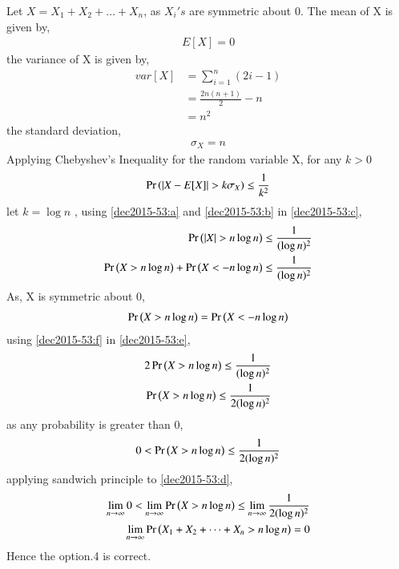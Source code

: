 Let $X= X_1 +X_2 + \dots + X_n $,
as $X_i 's$ are symmetric about 0.
The mean of X is given by,
\begin{align}
E[X]=0 \label{dec2015-53:a}
\end{align}
the variance of X is given by,
\begin{align}
var[X]&= \sum_{i=1}^{n}(2i -1)\\
   &= \frac{2n(n+1)}{2} - n\\
   &= n^{2}
\end{align}
the standard deviation,
\begin{align}
\sigma_X = n \label{dec2015-53:b}
\end{align}
Applying Chebyshev's Inequality for the random variable X, for any $k>0$
\begin{align}
\Pr\left(\left\vert X-E[X]\right\vert> k\sigma_X\right) \leq \frac{1}{k^{2}} \label{dec2015-53:c}
\end{align}
let $k=\log{n} $ ,
using \eqref{dec2015-53:a} and \eqref{dec2015-53:b} in \eqref{dec2015-53:c},
\begin{align}
\Pr\left(\left\vert X\right\vert> n\log{n}\right) \leq \frac{1}{(\log{n})^{2}}\\
\Pr\left(X> n\log{n}\right) + \Pr\left(X< -n\log{n}\right) \leq \frac{1}{(\log{n})^{2}} \label{dec2015-53:e}
\end{align}
As, X is symmetric about 0,
\begin{align}
\Pr\left(X> n\log{n}\right) =\Pr\left(X< -n\log{n}\right) \label{dec2015-53:f}
\end{align}
using \eqref{dec2015-53:f} in \eqref{dec2015-53:e},
\begin{align}
2\Pr\left(X> n\log{n}\right) \leq \frac{1}{(\log{n})^{2}}\\
\Pr\left(X> n\log{n}\right) \leq \frac{1}{2(\log{n})^{2}}
\end{align}
as any probability is greater than 0,
\begin{align}
0< \Pr\left(X> n\log{n}\right) \leq \frac{1}{2(\log{n})^{2}} \label{dec2015-53:d}
\end{align}
applying sandwich principle to \eqref{dec2015-53:d},
\begin{align}
\lim_{n \to \infty} 0< \lim_{n \to \infty} \Pr\left(X> n\log{n}\right) \leq \lim_{n \to \infty} \frac{1}{2(\log{n})^{2}}\\
\lim_{n \to \infty}\Pr\left(X_1 +X_2 + \dots + X_n > n\log{n}\right) = 0
\end{align}
Hence the option.4 is correct.